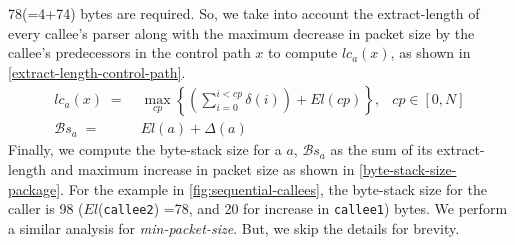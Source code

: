 \documentclass[letterpaper,twocolumn,10pt]{article}
\begin{document}
78(=4+74) bytes are required.  So, we take into account the
extract-length of every callee's parser along with the maximum
decrease in packet size by the callee's predecessors in the control
path $x$ to compute $lc_{a}(x)$, as shown in
\cref{extract-length-control-path}.
\begin{align}
lc_{a}(x) \; =& \; \max_{cp} \left\{ \left( \sum_{i=0}^{i<cp} \delta(i) \right)+ El(cp) \right\},&cp \in [0,N] \label{extract-length-control-path} \\
\mathcal{B}s_{a} \; =& \; El(a) + \Delta(a) & \label{byte-stack-size-package}
\end{align}
Finally, we compute the byte-stack size for a \uprogram $a$,
$\mathcal{B}s_{a}$  as the sum of its extract-length and maximum
increase in packet size as shown in \cref{byte-stack-size-package}.
For the example in \cref{fig:sequential-callees}, the byte-stack size
for the caller is 98 ($El$(\texttt{callee2}) =78, and 20 for increase
in \texttt{callee1}) bytes.
We perform a similar analysis for \textit{min-packet-size}. But, we
skip the details for brevity.
\end{document}
